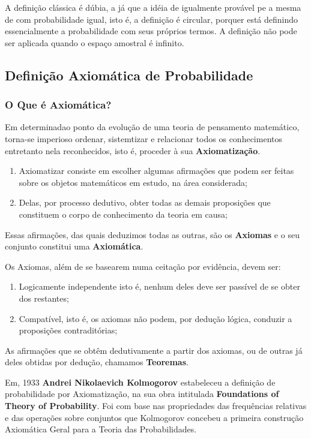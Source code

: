\inic A definição clássica é dúbia, a já que a idéia de igualmente provável pe a mesma de com probabilidade igual, isto é, a definição é circular, porquer está definindo essencialmente a probabilidade com seus próprios termos. A definição não pode ser aplicada quando o espaço amostral é infinito.


 \newpage
\subsection{Definição Axiomática de Probabilidade}
\subsubsection{O Que é Axiomática?}

\inic Em determinadao ponto da evolução de uma teoria de pensamento matemático, torna-se imperioso ordenar, sistemtizar e relacionar todos os conhecimentos entretanto nela reconhecidos, isto é, proceder à sua \textbf{Axiomatização}. 
 
\begin{enumerate}
\item Axiomatizar consiste em escolher algumas afirmações que podem ser feitas sobre os objetos matemáticos em estudo, na área considerada;
\item Delas, por processo dedutivo, obter todas as demais proposições que constituem o corpo de conhecimento da teoria em causa;
\end{enumerate} 

\inic Essas afirmações, das quais deduzimos todas as outras, são os \textbf{Axiomas} e o seu conjunto constitui uma \textbf{Axiomática}.\vskip0.3cm
 

\inic Os Axiomas, além de se basearem numa ceitação por evidência, devem ser:

\begin{enumerate}
    \item Logicamente independente isto é, nenhum deles deve ser passível de se obter dos restantes;
    \item Compatível, isto é, os axiomas não podem, por dedução lógica, conduzir a proposições contraditórias; 
\end{enumerate}
 
 \inic As afirmações que se obtêm dedutivamente a partir dos axiomas, ou de outras já deles obtidas por dedução, chamamos \textbf{Teoremas}.\vskip0.3cm

 \newpage
 \inic Em, 1933 \textbf{Andrei Nikolaevich Kolmogorov} estabeleceu a definição de probabilidade por Axiomatização, na sua obra intitulada \textbf{Foundations of Theory of Probability}. Foi com base nas propriedades das frequências relativas e das operações sobre conjuntos que Kolmogorov concebeu a primeira construção Axiomática Geral para a Teoria das Probabilidades.


